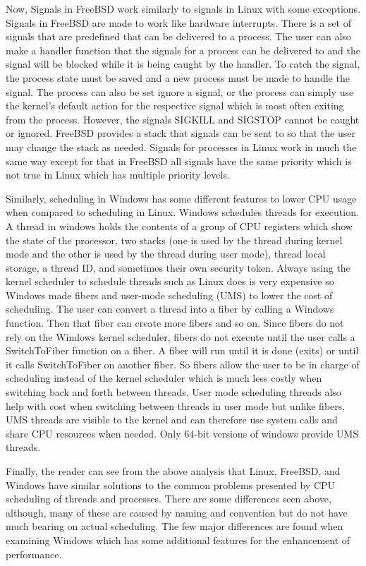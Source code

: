 \documentclass[letterpaper,10pt,onecolumn,draftclsnofoot,]{article}
\begin{document}
Now, Signals in FreeBSD work similarly to signals in Linux with some exceptions. Signals in FreeBSD are made to work like hardware interrupts. There is a set of signals that are predefined that can be delivered to a process. The user can also make a handler function that the signals for a process can be delivered to and the signal will be blocked while it is being caught by the handler. To catch the signal, the process state must be saved and a new process must be made to handle the signal. The process can also be set ignore a signal, or the process can simply use the kernel's default action for the respective signal which is most often exiting from the process. However, the signals SIGKILL and SIGSTOP cannot be caught or ignored. FreeBSD provides a stack that signals can be sent to so that the user may change the stack as needed. Signals for processes in Linux work in much the same way except for that in FreeBSD all signals have the same priority which is not true in Linux which has multiple priority levels.

Similarly, scheduling in Windows has some different features to lower CPU usage when compared to scheduling in Linux. Windows schedules threads for execution. A thread in windows holds the contents of a group of CPU registers which show the state of the processor, two stacks (one is used by the thread during kernel mode and the other is used by the thread during user mode), thread local storage, a thread ID, and sometimes their own security token. Always using the kernel scheduler to schedule threads such as Linux does is very expensive so Windows made fibers and user-mode scheduling (UMS) to lower the cost of scheduling. The user can convert a thread into a fiber by calling a Windows function. Then that fiber can create more fibers and so on. Since fibers do not rely on the Windows kernel scheduler, fibers do not execute until the user calls a SwitchToFiber function on a fiber. A fiber will run until it is done (exits) or until it calls SwitchToFiber on another fiber. So fibers allow the user to be in charge of scheduling instead of the kernel scheduler which is much less costly when switching back and forth between threads. User mode scheduling threads also help with cost when switching between threads in user mode but unlike fibers, UMS threads are visible to the kernel and can therefore use system calls and share CPU resources when needed. Only 64-bit versions of windows provide UMS threads.

Finally, the reader can see from the above analysis that Linux, FreeBSD, and Windows have similar solutions to the common problems presented by CPU scheduling of threads and processes. There are some differences seen above, although, many of these are caused by naming and convention but do not have much bearing on actual scheduling. The few major differences are found when examining Windows which has some additional features for the enhancement of performance.
\end{document}
